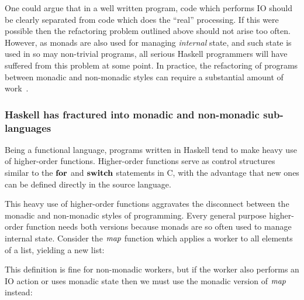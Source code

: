 One could argue that in a well written program, code which performs IO should be clearly separated from code which does the ``real'' processing. If this were possible then the refactoring problem outlined above should not arise too often. However, as monads are also used for managing \emph{internal} state, and such state is used in so may non-trivial programs, all serious Haskell programmers will have suffered from this problem at some point. In practice, the refactoring of programs between monadic and non-monadic styles can require a substantial amount of work~\cite{leucker:experience}.


\subsubsection{Haskell has fractured into monadic and non-monadic sub-languages}

Being a functional language, programs written in Haskell tend to make heavy use of higher-order functions. Higher-order functions serve as control structures similar to the $\textrm{\textbf{for}}$ and $\textrm{\textbf{switch}}$ statements in C, with the advantage that new ones can be defined directly in the source language.

This heavy use of higher-order functions aggravates the disconnect between the monadic and non-monadic styles of programming. Every general purpose higher-order function needs both versions because monads are so often used to manage internal state. Consider the $\operatorname{\mathit{map}}$ function which applies a worker to all elements of a list, yielding a new list:


This definition is fine for non-monadic workers, but if the worker also performs an IO action or uses monadic state then we must use the monadic version of $\operatorname{\mathit{map}}$ instead:


